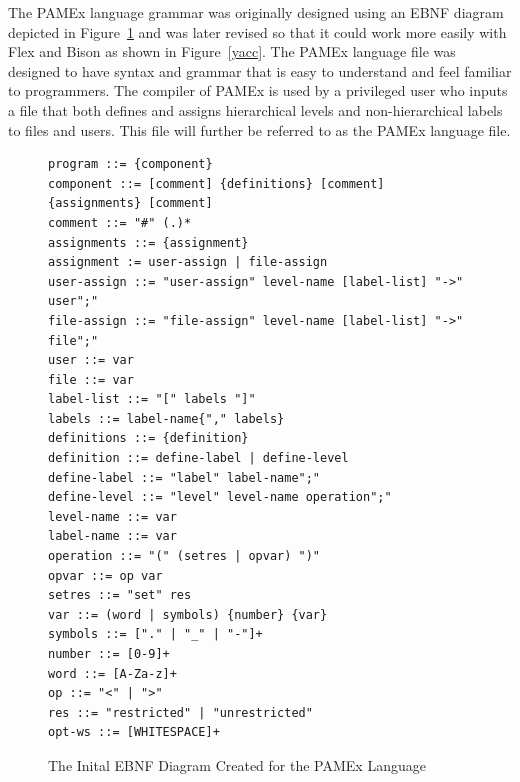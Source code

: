 The PAMEx language grammar was originally designed using an EBNF diagram 
depicted in Figure~\ref{initalebnf} and was later revised so that it could work more easily 
with Flex and Bison as shown in Figure~\ref{yacc}. The PAMEx language file was designed to have syntax and  
grammar that is easy to understand and feel familiar to programmers. The compiler of PAMEx is used by a 
privileged user who inputs a file that both defines and assigns 
hierarchical levels and non-hierarchical labels to files and users. 
This file will further be referred to as the PAMEx language file. 
\clearpage

\begin{figure}[htb]
    \centering
    \begin{tcolorbox}[width=\textwidth, boxsep=5pt, sharp corners, colback=white, colframe=black, fontupper=\footnotesize\ttfamily] %
        \begin{minipage}{\textwidth} %
            \begin{lstlisting}
program ::= {component}
component ::= [comment] {definitions} [comment] {assignments} [comment]
comment ::= "#" (.)*
assignments ::= {assignment}
assignment := user-assign | file-assign
user-assign ::= "user-assign" level-name [label-list] "->" user";"
file-assign ::= "file-assign" level-name [label-list] "->" file";"
user ::= var
file ::= var
label-list ::= "[" labels "]"
labels ::= label-name{"," labels}
definitions ::= {definition}
definition ::= define-label | define-level
define-label ::= "label" label-name";"
define-level ::= "level" level-name operation";"
level-name ::= var
label-name ::= var
operation ::= "(" (setres | opvar) ")"
opvar ::= op var
setres ::= "set" res
var ::= (word | symbols) {number} {var}
symbols ::= ["." | "_" | "-"]+
number ::= [0-9]+
word ::= [A-Za-z]+
op ::= "<" | ">"
res ::= "restricted" | "unrestricted"
opt-ws ::= [WHITESPACE]+   
            \end{lstlisting}
        \end{minipage}
    \end{tcolorbox}
    \caption[EBNF Created for PAMEx]{\label{initalebnf}The Inital EBNF Diagram Created for the PAMEx Language}
\end{figure}

\clearpage

